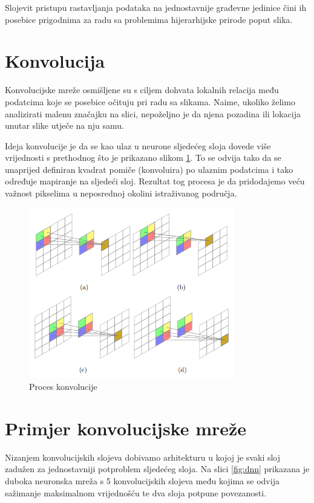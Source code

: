 \documentclass[lmodern, utf8, seminar]{fer}
\begin{document}
Slojevit pristupu rastavljanja podataka na jednostavnije građevne jedinice čini ih posebice prigodnima za radu sa problemima hijerarhijske prirode poput slika. 
\newline

\section{Konvolucija}
Konvolucijske mreže osmišljene su s ciljem dohvata lokalnih relacija među podatcima koje se posebice očituju pri radu sa slikama. Naime, ukoliko želimo analizirati malenu značajku na slici, nepoželjno je da njena pozadina ili lokacija unutar slike utječe na nju samu. 

Ideja konvolucije je da se kao ulaz u neurone sljedećeg sloja dovede više vrijednosti s prethodnog što je prikazano slikom \ref{fig:convolution}. To se odvija tako da se unaprijed definiran kvadrat pomiče (konvoluira) po ulaznim podatcima i tako određuje mapiranje na sljedeći sloj. Rezultat tog procesa je da pridodajemo veću važnost pikselima u neposrednoj okolini istraživanog područja.
\newline

\begin{figure}[H]
    \centering
    \includegraphics[width=0.8\textwidth]{convolution}
    \caption{Proces konvolucije}
    \label{fig:convolution}
\end{figure}

\section{Primjer konvolucijske mreže}
Nizanjem konvolucijskih slojeva dobivamo arhitekturu u kojoj je svaki sloj zadužen za jednostavniji potproblem sljedećeg sloja. Na slici \ref{fig:dnn} prikazana je duboka neuronska mreža s 5 konvolucijskih slojeva među kojima se odvija sažimanje maksimalnom vrijednošću te dva sloja potpune povezanosti.
\newline
\end{document}
